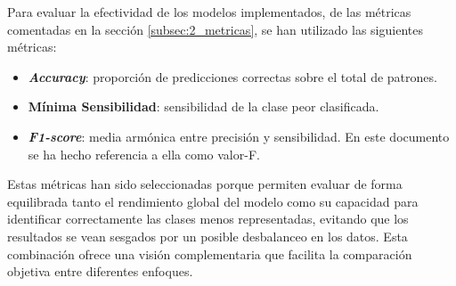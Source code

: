 Para evaluar la efectividad de los modelos implementados, de las métricas comentadas en la sección \ref{subsec:2_metricas}, se han utilizado las siguientes métricas:

\begin{itemize}
	\item \textbf{\textit{Accuracy}}: proporción de predicciones correctas sobre el total de patrones.
	\item \textbf{Mínima Sensibilidad}: sensibilidad de la clase peor clasificada.
	\item \textbf{\textit{F1-score}}: media armónica entre precisión y sensibilidad. En este documento se ha hecho referencia a ella como valor-F.
\end{itemize}

Estas métricas han sido seleccionadas porque permiten evaluar de forma equilibrada tanto el rendimiento global del modelo como su capacidad para identificar correctamente las clases menos representadas, evitando que los resultados se vean sesgados por un posible desbalanceo en los datos. Esta combinación ofrece una visión complementaria que facilita la comparación objetiva entre diferentes enfoques.